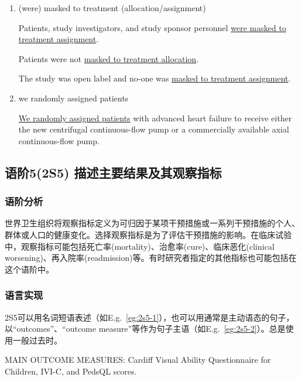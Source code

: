 \documentclass[a4paper]{ctexbook}
\begin{document}
\begin{enumerate}
      \item (were) masked to treatment (allocation/assignment)
      \begin{eg}{}
        Patients, study investigators, and study sponsor personnel \uline{were masked to treatment assignment}.
      \end{eg}
      \begin{eg}{}
        Patients were not \uline{masked to treatment allocation}.
      \end{eg}
      \begin{eg}{}
        The study was open label and no-one was \uline{masked to treatment assignment}.
      \end{eg}

      \item we randomly assigned patients
      \begin{eg}{}
        \uline{We randomly assigned patients} with advanced heart failure to receive either the new centrifugal continuous-flow pump or a commercially available axial continuous-flow pump.
      \end{eg}
    \end{enumerate}

  \subsection{语阶5(2S5) 描述主要结果及其观察指标}

    \subsubsection{语阶分析}

    世界卫生组织将观察指标定义为可归因于某项干预措施或一系列干预措施的个人、群体或人口的健康变化。选择观察指标是为了评估干预措施的影响。在临床试验中，观察指标可能包括死亡率(mortality)、治愈率(cure)、临床恶化(clinical worsening)、再入院率(readmission)等。有时研究者指定的其他指标也可能包括在这个语阶中。

    \subsubsection{语言实现}

    2S5可以用名词短语表述（如E.g.~\ref{eg:2s5-1}），也可以用通常是主动语态的句子，以“outcomes”、“outcome measure”等作为句子主语（如E.g.~\ref{eg:2s5-2}）。总是使用一般过去时。

    \begin{eg}[label={eg:2s5-1}]{}
      MAIN OUTCOME MEASURES: Cardiff Visual Ability Questionnaire for Children, IVI-C, and PedsQL scores.
    \end{eg}
\end{document}
